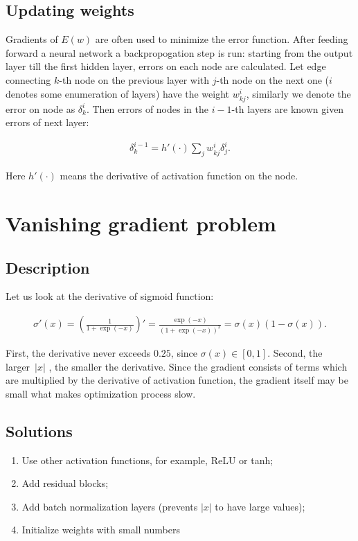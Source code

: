 \documentclass{article}
\begin{document}
\subsection{Updating weights}

Gradients of $E(w)$ are often used to minimize the error function. After feeding forward a neural network a backpropogation step is run: starting from the output layer till the first hidden layer, errors on each node are calculated. Let edge connecting $k$-th node on the previous layer with $j$-th node on the next one ($i$ denotes some enumeration of layers) have the weight $w^i_{kj}$, similarly we denote the error on node as $\delta_k^i$. Then errors of nodes in the $i-1$-th layers are known given errors of next layer:

\begin{align*}
\delta^{i-1}_k = h'(\cdot)\sum_j w^i_{kj} \delta^i_j.
\end{align*}

Here $h'(\cdot)$ means the derivative of activation function on the node.

\section{Vanishing gradient problem}

\subsection{Description}

Let us look at the derivative of sigmoid function:

\begin{align*}
	\sigma'(x) = \left(\frac{1}{1 + \exp (-x)}\right)'= \frac{\exp (-x)}{(1 + \exp (-x))^2} = \sigma(x) (1 - \sigma (x)). 
\end{align*}

First, the derivative never exceeds $0.25$, since $\sigma(x) \in [0, 1]$. Second, the larger~$|x|$ , the smaller the derivative. Since the gradient consists of terms which are multiplied by the derivative of activation function, the gradient itself may be small what makes optimization process slow.

\subsection{Solutions}

\begin{enumerate}
	\item Use other activation functions, for example, ReLU or tanh;
	\item Add residual blocks;
	\item Add batch normalization layers (prevents $|x|$ to have large values);
	\item Initialize weights with small numbers
\end{enumerate}
\end{document}
